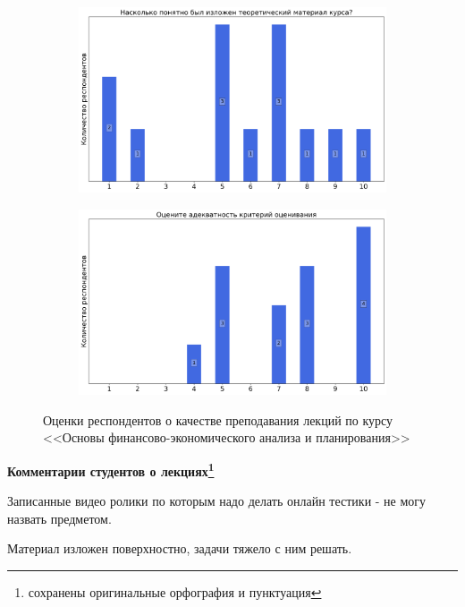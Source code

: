 \begin{figure}[H]
\begin{subfigure}[b]{0.45\textwidth}
			\end{subfigure}
			\begin{subfigure}[b]{0.45\textwidth}
				\centering
				\includegraphics[width=\textwidth]{images/4 course/Основы финансово-экономического анализа и планирования/lecturer-marks-Старостин Е.А.-2.png}
			\end{subfigure}	
			\begin{subfigure}[b]{0.45\textwidth}
				\centering
				\includegraphics[width=\textwidth]{images/4 course/Основы финансово-экономического анализа и планирования/lecturer-marks-Старостин Е.А.-3.png}
			\end{subfigure}
			\caption{Оценки респондентов о качестве преподавания лекций по курсу <<Основы финансово-экономического анализа и планирования>>}
		\end{figure}

		\textbf{Комментарии студентов о лекциях\protect\footnote{сохранены оригинальные орфография и пунктуация}}
            \begin{commentbox} 
                Записанные видео ролики по которым надо делать онлайн тестики - не могу назвать предметом. 
        
                Материал изложен поверхностно, задачи тяжело с ним решать.  
            \end{commentbox} 
        

